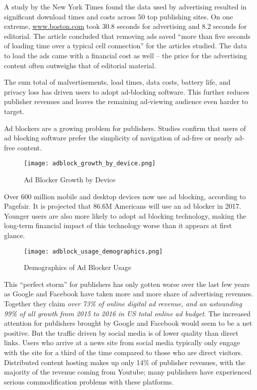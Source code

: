\documentclass[11pt]{article}
\begin{document}
A study by the New York Times found the data used by advertising resulted in significant  download times and costs across 50 top publishing sites. On one extreme, \href{https://www.boston.com}{www.boston.com} took 30.8 seconds for advertising and 8.2 seconds for editorial. The article concluded that removing ads saved ``more than five seconds of loading time over a typical cell connection'' for the articles studied. The data to load the ads came with a financial cost as well -- the price for the advertising content often outweighs that of editorial material.

The sum total of malvertisements, load times, data costs, battery life, and privacy loss has driven users to adopt ad-blocking software. This further reduces publisher revenues and leaves the remaining ad-viewing audience even harder to target.

Ad blockers are a growing problem for publishers. Studies confirm that users of ad blocking software prefer the simplicity of navigation of ad-free or nearly ad-free content.  


\begin{figure}
\begin{center}
\texttt{[image: adblock\_growth\_by\_device.png]}
\caption{Ad Blocker Growth by Device}
\end{center}
\end{figure}


 Over 600 million mobile and desktop devices now use ad blocking, according to Pagefair. It is projected that 86.6M Americans will use an ad blocker in 2017\cite{10}. Younger users are also more likely to adopt ad blocking technology, making the long-term financial impact of this technology worse than it appears at first glance\cite{11}.



\begin{figure}
\begin{center}
\texttt{[image: adblock\_usage\_demographics.png]}
\caption{Demographics of Ad Blocker Usage}
\end{center}
\end{figure}



This ``perfect storm'' for publishers has only gotten worse over the last few years as Google and Facebook have taken more and more share of advertising revenues. Together they claim \textit{over 73\% of online digital ad revenue, and an astounding 99\% of all growth from 2015 to 2016 in US total online ad budget}\cite{12}.
The increased attention for publishers brought by Google and Facebook would seem to be a net positive. But the traffic driven by social media is of lower quality than direct links. Users who arrive at a news site from social media typically only engage with the site for a third\cite{SocMed} of the time compared to those who are direct visitors. Distributed content hosting makes up only 14\% of publisher revenues, with the majority of the revenue coming from Youtube\cite{DCN}; many publishers have experienced serious commodification problems with these platforms.
\end{document}

